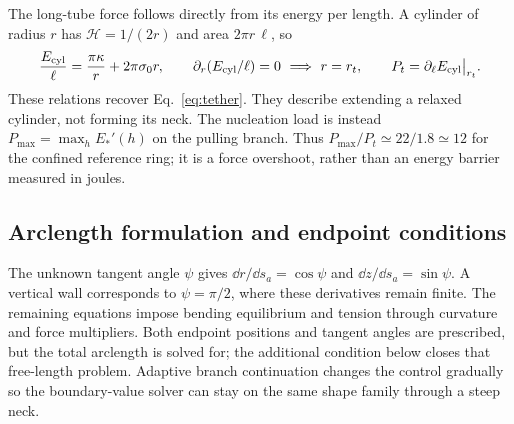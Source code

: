 

The long-tube force follows directly from its energy per length. A cylinder of radius $r$ has $\mathcal H=1/(2r)$ and area $2\pi r\,\ell$, so
\begin{equation}
\frac{E_{\rm cyl}}{\ell}=\frac{\pi\kappa}{r}+2\pi\sigma_0r,
\qquad \partial_r(E_{\rm cyl}/\ell)=0
\ \Longrightarrow\ r=r_t,
\qquad P_t=\partial_\ell E_{\rm cyl}\big|_{r_t}.
\label{eq:tube-energy}
\end{equation}
These relations recover Eq.~\eqref{eq:tether}. They describe extending a relaxed cylinder, not forming its neck. The nucleation load is instead $P_{\max}=\max_h E_*'(h)$ on the pulling branch. Thus $P_{\max}/P_t\simeq22/1.8\simeq12$ for the confined reference ring; it is a force overshoot, rather than an energy barrier measured in joules.

\subsection{Arclength formulation and endpoint conditions}


The unknown tangent angle $\psi$ gives $\dd r/\dd s_a=\cos\psi$ and $\dd z/\dd s_a=\sin\psi$. A vertical wall corresponds to $\psi=\pi/2$, where these derivatives remain finite. The remaining equations impose bending equilibrium and tension through curvature and force multipliers. Both endpoint positions and tangent angles are prescribed, but the total arclength is solved for; the additional condition below closes that free-length problem. Adaptive branch continuation changes the control gradually so the boundary-value solver can stay on the same shape family through a steep neck.


